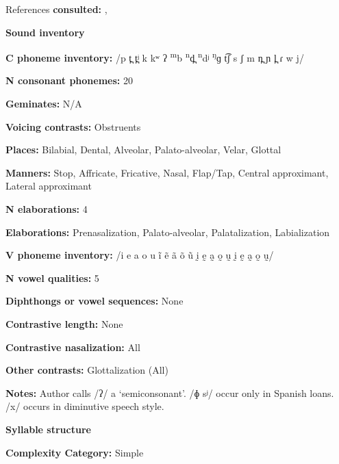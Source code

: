 References \textbf{consulted:} \citet{Bradley1971}, \citet{Costello2014}



\textbf{Sound inventory}



\textbf{C phoneme inventory:} /p t̪ t̪ʲ k kʷ ʔ \textsuperscript{m}b \textsuperscript{n}d̪ \textsuperscript{n}dʲ \textsuperscript{ŋ}ɡ t͡ʃ s ʃ m n̪ ɲ l̪ ɾ w j/



\textbf{N consonant phonemes:} 20



\textbf{Geminates:} N/A



\textbf{Voicing contrasts:} Obstruents



\textbf{Places:} Bilabial, Dental, Alveolar, Palato-alveolar, Velar, Glottal



\textbf{Manners:} Stop, Affricate, Fricative, Nasal, Flap/Tap, Central approximant, Lateral approximant



\textbf{N elaborations:} 4



\textbf{Elaborations:} Prenasalization, Palato-alveolar, Palatalization, Labialization



\textbf{V phoneme inventory:} /i e a o u ĩ ẽ ã õ ũ ḭ ḛ a̰ o̰ ṵ ḭ ḛ a̰ o̰ ṵ/



\textbf{N vowel qualities:} 5



\textbf{Diphthongs or vowel sequences:} None



\textbf{Contrastive length:} None



\textbf{Contrastive nasalization:} All



\textbf{Other contrasts:} Glottalization (All)



\textbf{Notes:} Author calls /ʔ/ a ‘semiconsonant’. /ɸ sʲ/ occur only in Spanish loans. /x/ occurs in diminutive speech style.



\textbf{Syllable structure}



\textbf{Complexity Category:} Simple



